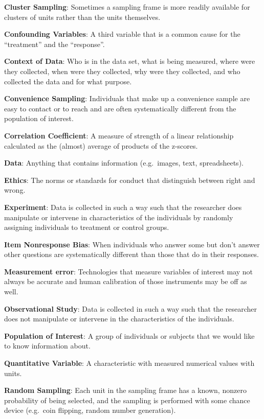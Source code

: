 \documentclass[
]{book}
\begin{document}
\textbf{Cluster Sampling}: Sometimes a sampling frame is more readily available for clusters of units rather than the units themselves.

\textbf{Confounding Variables}: A third variable that is a common cause for the ``treatment'' and the ``response''.

\textbf{Context of Data}: Who is in the data set, what is being measured, where were they collected, when were they collected, why were they collected, and who collected the data and for what purpose.

\textbf{Convenience Sampling}: Individuals that make up a convenience sample are easy to contact or to reach and are often systematically different from the population of interest.

\textbf{Correlation Coefficient}: A measure of strength of a linear relationship calculated as the (almost) average of products of the z-scores.

\textbf{Data}: Anything that contains information (e.g.~images, text, spreadsheets).

\textbf{Ethics}: The norms or standards for conduct that distinguish between right and wrong.

\textbf{Experiment}: Data is collected in such a way such that the researcher does manipulate or intervene in characteristics of the individuals by randomly assigning individuals to treatment or control groups.

\textbf{Item Nonresponse Bias}: When individuals who answer some but don't answer other questions are systematically different than those that do in their responses.

\textbf{Measurement error}: Technologies that measure variables of interest may not always be accurate and human calibration of those instruments may be off as well.

\textbf{Observational Study}: Data is collected in such a way such that the researcher does not manipulate or intervene in the characteristics of the individuals.

\textbf{Population of Interest}: A group of individuals or subjects that we would like to know information about.

\textbf{Quantitative Variable}: A characteristic with measured numerical values with units.

\textbf{Random Sampling}: Each unit in the sampling frame has a known, nonzero probability of being selected, and the sampling is performed with some chance device (e.g.~coin flipping, random number generation).
\end{document}
